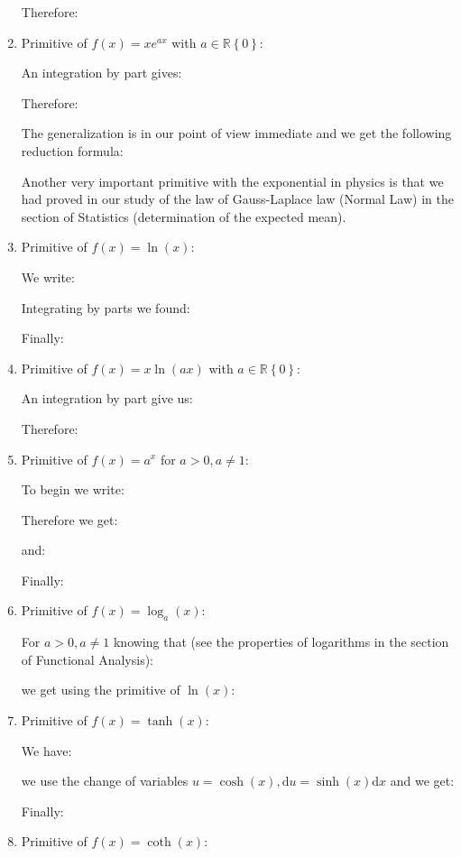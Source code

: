\begin{enumerate}
		Therefore:
		
		\item Primitive of $f(x)=xe^{ax}$ with $a\in \mathbb{R}\left\lbrace 0 \right\rbrace$:
		
		An integration by part gives:
		
		Therefore:
		
		The generalization is in our point of view immediate and we get the following reduction formula:
		
		\begin{tcolorbox}[title=Remark,colframe=black,arc=10pt]
		Another very important primitive with the exponential in physics is that we had proved in our study of the law of Gauss-Laplace law (Normal Law) in the section of Statistics (determination of the expected mean).
		\end{tcolorbox}
		\item Primitive of $f(x)=\ln(x)$:
		
		We write:
		
		Integrating by parts we found:
		
		Finally:
		
		\item Primitive of $f(x)=x\ln(ax)$ with $a\in \mathbb{R}\left\lbrace 0 \right\rbrace$:
		
		An integration by part give us:
		
		Therefore:
		
		\item Primitive of $f(x)=a^x$ for $a>0,a\neq 1$:
		
		To begin we write:
		
		Therefore we get:
		
		and:
		
		Finally:
		
		\item Primitive of $f(x)=\log_a(x)$:
		
		For $a>0,a\neq 1$ knowing that (see the properties of logarithms in the section of Functional Analysis):
		
		we get using the primitive of $\ln(x)$:
		
		\item Primitive of $f(x)=\tanh(x)$:
		
		We have:
		
		we use the change of variables $u=\cosh(x),\mathrm{d}u=\sinh(x)\mathrm{d}x$ and we get:
		
		Finally:
		
		\item Primitive of $f(x)=\coth(x)$:
		

\end{enumerate}
